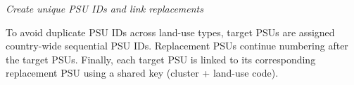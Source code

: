 \documentclass[
  10pt,
  b5paper,
  oneside]{book}
\newenvironment{Shaded}{\begin{snugshade}}{\end{snugshade}}
\newcommand{\CommentTok}[1]{\textcolor[rgb]{0.56,0.35,0.01}{\textit{#1}}}
\newcommand{\ControlFlowTok}[1]{\textcolor[rgb]{0.13,0.29,0.53}{\textbf{#1}}}
\newcommand{\FunctionTok}[1]{\textcolor[rgb]{0.13,0.29,0.53}{\textbf{#1}}}
\newcommand{\NormalTok}[1]{#1}
\newcommand{\OtherTok}[1]{\textcolor[rgb]{0.56,0.35,0.01}{#1}}
\newcommand{\SpecialCharTok}[1]{\textcolor[rgb]{0.81,0.36,0.00}{\textbf{#1}}}
\newcommand{\StringTok}[1]{\textcolor[rgb]{0.31,0.60,0.02}{#1}}
\begin{document}
\begin{Shaded}
\end{Shaded}

\emph{Create unique PSU IDs and link replacements}

To avoid duplicate PSU IDs across land-use types, target PSUs are assigned country-wide sequential PSU IDs. Replacement PSUs continue numbering after the target PSUs. Finally, each target PSU is linked to its corresponding replacement PSU using a shared key (cluster + land-use code).
\end{document}
